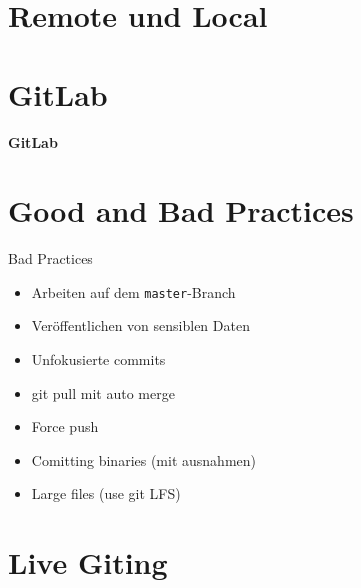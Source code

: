 \documentclass[
    ngerman,
    accentcolor=TUDa-1c,
    fontsize= 12pt,
    a4paper,
    aspectratio=169,
    colorback=true,
    fancy_row_colors,
    leqno,
    fleqn,
    boxarc=3pt,
    fleqn,
    ]{algoslides}
\begin{document}
\section{Remote und Local}
\begin{frame}[c]
    \slidehead
    \center
\end{frame}

\section{GitLab}

\begin{frame}[c]
    \centering
    \Large
    \textbf{GitLab}
\end{frame}

\section{Good and Bad Practices}

\begin{frame}{Bad Practices}
    \slidehead
    \begin{itemize}
        \item Arbeiten auf dem \texttt{master}-Branch
        \item Veröffentlichen von sensiblen Daten
        \item Unfokusierte commits
        \item git pull mit auto merge
        \item Force push
        \item Comitting binaries (mit ausnahmen)
        \item Large files (use git LFS)
    \end{itemize}
\end{frame}

\section{Live Giting}
\end{document}
